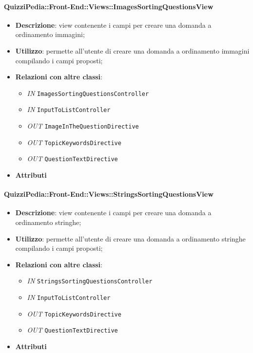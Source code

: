 \paragraph{QuizziPedia::Front-End::Views::ImagesSortingQuestionsView}
\begin{itemize}
	\item \textbf{Descrizione}: view contenente i campi per creare una domanda a ordinamento immagini;
	\item \textbf{Utilizzo}: permette all'utente di creare una domanda a ordinamento immagini compilando i campi proposti;
	\item \textbf{Relazioni con altre classi}:
	\begin{itemize}
		\item \textit{IN} \texttt{ImagesSortingQuestionsController} \\
		\item \textit{IN} \texttt{InputToListController} \\
		\item \textit{OUT} \texttt{ImageInTheQuestionDirective} \\
		\item \textit{OUT} \texttt{TopicKeywordsDirective} \\
		\item \textit{OUT} \texttt{QuestionTextDirective} \\ 
	\end{itemize}
	\item \textbf{Attributi}
\end{itemize}

\paragraph{QuizziPedia::Front-End::Views::StringsSortingQuestionsView}
\begin{itemize}
	\item \textbf{Descrizione}: view contenente i campi per creare una domanda a ordinamento stringhe;
	\item \textbf{Utilizzo}: permette all'utente di creare una domanda a ordinamento stringhe compilando i campi proposti;
	\item \textbf{Relazioni con altre classi}:
		\begin{itemize}
			\item \textit{IN} \texttt{StringsSortingQuestionsController} \\
			\item \textit{IN} \texttt{InputToListController} \\
			\item \textit{OUT} \texttt{TopicKeywordsDirective} \\
			\item \textit{OUT} \texttt{QuestionTextDirective} \\ 
		\end{itemize}
	\item \textbf{Attributi}
\end{itemize}

